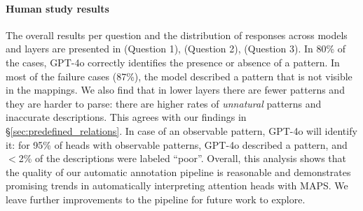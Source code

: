 \documentclass[11pt]{article}
\newcommand{\GPTFourO}{GPT-4o}
\newcommand{\framework}{\textsc{MAPS}}
\begin{document}
\paragraph{Human study results}
The overall results per question and the distribution of responses across models and layers are presented in  (Question 1),  (Question 2),  (Question 3).
In 80\% of the cases, \GPTFourO{} correctly identifies the presence or absence of a pattern. 
In most of the failure cases (87\%), the model described a pattern that is not visible in the mappings. 
We also find that in lower layers there are fewer patterns and they are harder to parse: there are higher rates of \emph{unnatural} patterns and inaccurate descriptions. This agrees with our findings in \S\ref{sec:predefined_relations}. 
In case of an observable pattern, \GPTFourO{} will identify it: for 95\% of heads with observable patterns, \GPTFourO{} described a pattern, and $<$2\% of the descriptions were labeled ``poor''. 
Overall, this analysis shows that the quality of our automatic annotation pipeline is reasonable and demonstrates promising trends in automatically interpreting attention heads with \framework{}. We leave further improvements to the pipeline for future work to explore.
\end{document}
